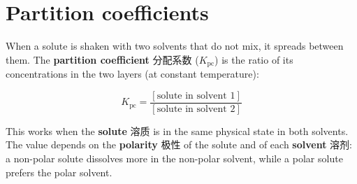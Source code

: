 \documentclass[11pt]{article}
\begin{document}
\section*{Partition coefficients}

When a solute is shaken with two solvents that do not mix, it spreads between them. The \textbf{partition coefficient} 分配系数 ($K_{\text{pc}}$) is the ratio of its concentrations in the two layers (at constant temperature):

\[
K_{\text{pc}} = \frac{[\text{solute in solvent 1}]}{[\text{solute in solvent 2}]}
\]

This works when the \textbf{solute} 溶质 is in the same physical state in both solvents. The value depends on the \textbf{polarity} 极性 of the solute and of each \textbf{solvent} 溶剂: a non-polar solute dissolves more in the non-polar solvent, while a polar solute prefers the polar solvent.
\end{document}
